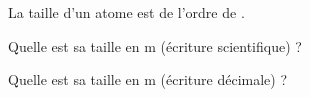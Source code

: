 La taille d’un atome est de l’ordre de . 

\debutEntrainement

%
\begin{enonce}
Quelle est sa taille en m (écriture scientifique)  ? 
\end{enonce}






\begin{enonce}
Quelle est sa taille en m (écriture décimale) ? 
\end{enonce}





\finEntrainement






\hauteurLargeurCadreReponse		{8mm}{4cm}
\initialisationEntrainement

